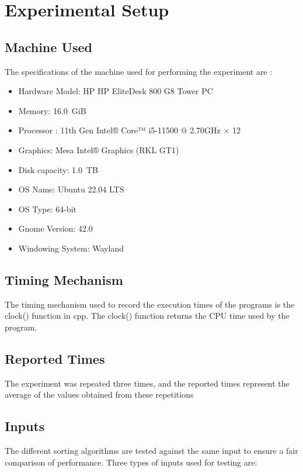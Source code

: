 \documentclass[12pt]{article}
\begin{document}
\section{Experimental Setup}

    \subsection{Machine Used}
    The specifications of the machine used for performing the experiment are :
        \begin{itemize}
            \item Hardware Model: HP HP EliteDesk 800 G8 Tower PC
            \item Memory: 16.0 GiB
            \item Processor : 11th Gen Intel® Core™ i5-11500 @ 2.70GHz × 12 
            \item Graphics: Mesa Intel® Graphics (RKL GT1)
            \item Disk capacity: 1.0 TB
         
            \item OS Name: Ubuntu 22.04 LTS
            \item OS Type: 64-bit
            \item Gnome Version: 42.0
            \item Windowing System: Wayland
        \end{itemize}

    \subsection{Timing Mechanism}
    The timing mechanism used to record the execution times of the programs is the clock() function in cpp. The clock() function returns the CPU time used by the program.

    \subsection{Reported Times}
    The experiment was repeated three times, and the reported times represent the average of the values obtained from these repetitions
    
    \subsection{Inputs}
    The different sorting algorithms are tested against the same input to ensure a fair comparison of performance. Three types of inputs used for testing are:
    
\end{document}
